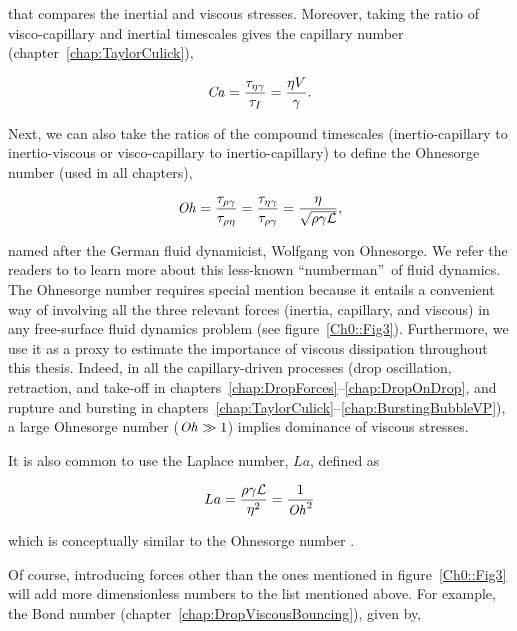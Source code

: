 \noindent that compares the inertial and viscous stresses. Moreover, taking the ratio of visco-capillary and inertial timescales gives the capillary number (chapter~\ref{chap:TaylorCulick}),

\begin{align}\label{Ch0::Ca}
	\mathit{Ca} = \frac{\tau_{\eta\gamma}}{\tau_I} =  \frac{\eta V}{\gamma}.
\end{align}

Next, we can also take the ratios of the compound timescales (inertio-capillary to inertio-viscous or visco-capillary to inertio-capillary) to define the Ohnesorge number (used in all chapters), 

\begin{align}\label{Ch0::Oh}
	\mathit{Oh} = \frac{\tau_{\rho\gamma}}{\tau_{\rho\eta}} = \frac{\tau_{\eta\gamma}}{\tau_{\rho\gamma}}  = \frac{\eta}{\sqrt{\rho\gamma\mathcal{L}}},
\end{align}

\noindent named after the German fluid dynamicist, Wolfgang von Ohnesorge. We refer the readers to \citet{mckinley2011wolfgang} to learn more about this less-known \textquotedblleft numberman\textquotedblright\, of fluid dynamics. The Ohnesorge number requires special mention because it entails a convenient way of involving all the three relevant forces (inertia, capillary, and viscous) in any free-surface fluid dynamics problem (see figure~\ref{Ch0::Fig3}). Furthermore, we use it as a proxy to estimate the importance of viscous dissipation throughout this thesis. Indeed, in all the capillary-driven processes (drop oscillation, retraction, and take-off in chapters~\ref{chap:DropForces}--\ref{chap:DropOnDrop}, and rupture and bursting in chapters~\ref{chap:TaylorCulick}--\ref{chap:BurstingBubbleVP}), a large Ohnesorge number ($\mathit{Oh} \gg 1$) implies dominance of viscous stresses. 

It is also common to use the Laplace number, $La$, defined as

\begin{align}\label{Ch0::La}
	La = \frac{\rho\gamma\mathcal{L}}{\eta^2} = \frac{1}{\mathit{Oh}^2}
\end{align}

\noindent which is conceptually similar to the Ohnesorge number \citep{mckinley2011wolfgang}. 

Of course, introducing forces other than the ones mentioned in figure~\ref{Ch0::Fig3} will add more dimensionless numbers to the list mentioned above. For example, the Bond number (chapter~\ref{chap:DropViscousBouncing}), given by, 

